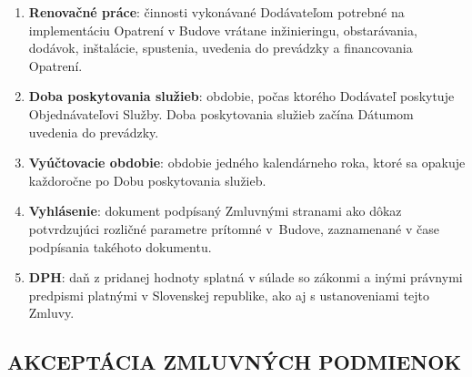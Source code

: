 \begin{multicols}{2}
\begin{enumerate}
\item\textbf{Renovačné práce}: činnosti vykonávané Dodávateľom potrebné na
implementáciu Opatrení v Budove vrátane inžinieringu, obstarávania,
dodávok, inštalácie, spustenia, uvedenia do prevádzky a financovania
Opatrení.

\item\textbf{Doba poskytovania služieb}: obdobie, počas ktorého Dodávateľ
poskytuje Objednávateľovi Služby. Doba poskytovania služieb začína
Dátumom uvedenia do prevádzky.

\item\textbf{Vyúčtovacie obdobie}: obdobie jedného kalendárneho roka, ktoré
sa opakuje každoročne po Dobu poskytovania služieb.

\item\textbf{Vyhlásenie}: dokument podpísaný Zmluvnými stranami ako dôkaz
potvrdzujúci rozličné parametre prítomné v~Budove, zaznamenané v čase
podpísania takéhoto dokumentu.

\item\textbf{DPH}: daň z pridanej hodnoty splatná v súlade so zákonmi a inými
právnymi predpismi platnými v Slovenskej republike, ako aj s
ustanoveniami tejto Zmluvy.
\end{enumerate}
\subsection{AKCEPTÁCIA ZMLUVNÝCH PODMIENOK }


\end{multicols}
